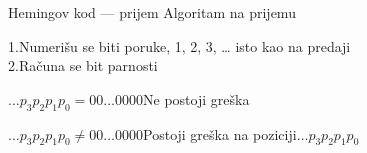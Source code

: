 \begin{frame}[label=06-s029]{Hemingov kod — prijem}
\fontsize{10}{12}\selectfont\setlength{\parskip}{2pt} Algoritam na prijemu\par\vspace{1mm}
1.\quad Numerišu se biti poruke, 1, 2, 3, … isto kao na predaji\\
2.\quad Računa se bit parnosti\par\vspace{1mm}
\centering\par\vspace{1mm}
$\ldots p_3p_2p_1p_0=00\ldots0000$\quad Ne postoji greška\par\vspace{1mm}
$\ldots p_3p_2p_1p_0\ne00\ldots0000$\quad Postoji greška na poziciji\quad $\ldots p_3p_2p_1p_0$
\end{frame}
